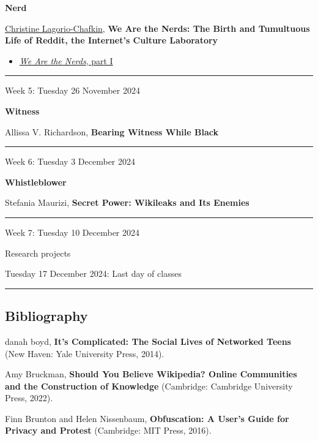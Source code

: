 \documentclass[
  letterpaper,
  DIV=11,
  numbers=noendperiod,
  oneside]{scrartcl}
\providecommand{\tightlist}{%
  \setlength{\itemsep}{0pt}\setlength{\parskip}{0pt}}\usepackage{longtable,booktabs,array}
\begin{document}
\textbf{Nerd}

\href{https://x.com/lagorio}{Christine Lagorio-Chafkin}, \textbf{We Are
the Nerds: The Birth and Tumultuous Life of Reddit, the Internet's
Culture Laboratory}

\begin{itemize}
\tightlist
\item
  \href{pdf/lagorio-wearethenerds-part1.pdf}{\emph{We Are the Nerds},
  part I}
\end{itemize}

\begin{center}\rule{0.5\linewidth}{0.5pt}\end{center}

Week 5: Tuesday 26 November 2024

\textbf{Witness}

Allissa V. Richardson, \textbf{Bearing Witness While Black}

\begin{center}\rule{0.5\linewidth}{0.5pt}\end{center}

Week 6: Tuesday 3 December 2024

\textbf{Whistleblower}

Stefania Maurizi, \textbf{Secret Power: Wikileaks and Its Enemies}

\begin{center}\rule{0.5\linewidth}{0.5pt}\end{center}

Week 7: Tuesday 10 December 2024

Research projects

Tuesday 17 December 2024: Last day of classes

\begin{center}\rule{0.5\linewidth}{0.5pt}\end{center}

\subsection{Bibliography}\label{bibliography}

danah boyd, \textbf{It's Complicated: The Social Lives of Networked
Teens} (New Haven: Yale University Press, 2014).

Amy Bruckman, \textbf{Should You Believe Wikipedia? Online Communities
and the Construction of Knowledge} (Cambridge: Cambridge University
Press, 2022).

Finn Brunton and Helen Nissenbaum, \textbf{Obfuscation: A User's Guide
for Privacy and Protest} (Cambridge: MIT Press, 2016).
\end{document}

